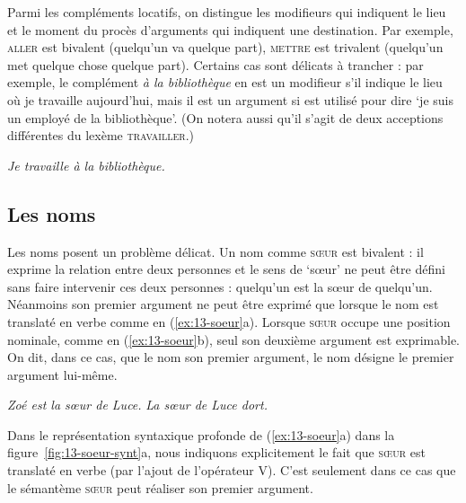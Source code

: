 Parmi les compléments locatifs, on distingue les modifieurs qui indiquent le lieu et le moment du procès d’arguments qui indiquent une destination. Par exemple, \textsc{aller} est bivalent (quelqu’un va quelque part), \textsc{mettre} est trivalent (quelqu’un met quelque chose quelque part). Certains cas sont délicats à trancher : par exemple, le complément \textit{à la bibliothèque} en  est un modifieur s’il indique le lieu où je travaille aujourd’hui, mais il est un argument si  est utilisé pour dire ‘je suis un employé de la bibliothèque’. (On notera aussi qu'il s'agit de deux acceptions différentes du lexème \textsc{travailler}.)

\ea\label{ex:travailler} \textit{Je travaille à la bibliothèque.}\z

\subsection{Les noms} 
Les noms posent un problème délicat. Un nom comme \textsc{sœur} est bivalent : il exprime la relation entre deux personnes et le sens de ‘sœur’ ne peut être défini sans faire intervenir ces deux personnes : quelqu'un est la sœur de quelqu'un. Néanmoins son premier argument ne peut être exprimé que lorsque le nom est translaté en verbe comme en (\ref{ex:13-soeur}a). Lorsque \textsc{sœur} occupe une position nominale, comme en  (\ref{ex:13-soeur}b), seul son deuxième argument est exprimable. On dit, dans ce cas, que le nom  son premier argument, le nom désigne le premier argument lui-même.

\ea\label{ex:13-soeur}
\ea \textit{Zoé est la sœur de Luce.}
\ex \textit{La sœur de Luce dort.}\z\z

Dans le représentation syntaxique profonde de (\ref{ex:13-soeur}a) dans la figure~\ref{fig:13-soeur-synt}a, nous indiquons explicitement le fait que \textsc{sœur} est translaté en verbe (par l'ajout de l'opérateur V). C'est seulement dans ce cas que le sémantème \textsc{sœur} peut réaliser son premier argument.

